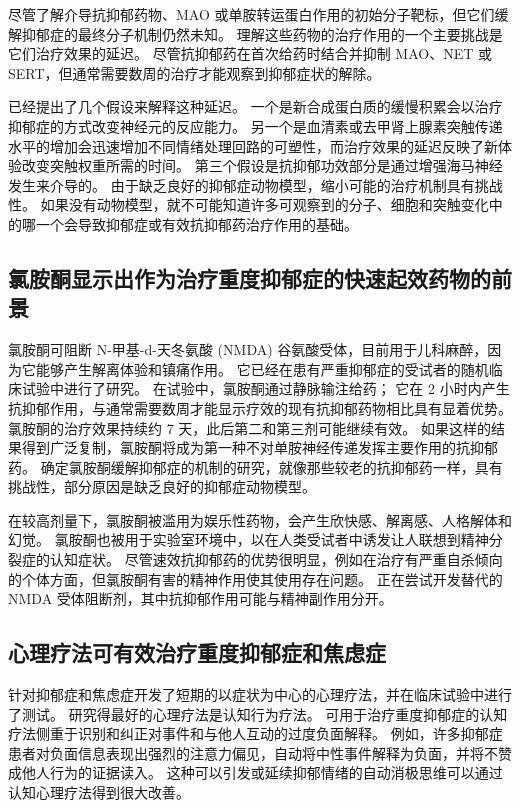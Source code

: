 尽管了解介导抗抑郁药物、MAO 或单胺转运蛋白作用的初始分子靶标，但它们缓解抑郁症的最终分子机制仍然未知。
理解这些药物的治疗作用的一个主要挑战是它们治疗效果的延迟。
尽管抗抑郁药在首次给药时结合并抑制 MAO、NET 或 SERT，但通常需要数周的治疗才能观察到抑郁症状的解除。


已经提出了几个假设来解释这种延迟。
一个是新合成蛋白质的缓慢积累会以治疗抑郁症的方式改变神经元的反应能力。
另一个是血清素或去甲肾上腺素突触传递水平的增加会迅速增加不同情绪处理回路的可塑性，而治疗效果的延迟反映了新体验改变突触权重所需的时间。
第三个假设是抗抑郁功效部分是通过增强海马神经发生来介导的。
由于缺乏良好的抑郁症动物模型，缩小可能的治疗机制具有挑战性。
如果没有动物模型，就不可能知道许多可观察到的分子、细胞和突触变化中的哪一个会导致抑郁症或有效抗抑郁药治疗作用的基础。



\subsection{氯胺酮显示出作为治疗重度抑郁症的快速起效药物的前景}

氯胺酮可阻断 N-甲基-d-天冬氨酸 (NMDA) 谷氨酸受体，目前用于儿科麻醉，因为它能够产生解离体验和镇痛作用。
它已经在患有严重抑郁症的受试者的随机临床试验中进行了研究。
在试验中，氯胺酮通过静脉输注给药；
它在 2 小时内产生抗抑郁作用，与通常需要数周才能显示疗效的现有抗抑郁药物相比具有显着优势。
氯胺酮的治疗效果持续约 7 天，此后第二和第三剂可能继续有效。
如果这样的结果得到广泛复制，氯胺酮将成为第一种不对单胺神经传递发挥主要作用的抗抑郁药。
确定氯胺酮缓解抑郁症的机制的研究，就像那些较老的抗抑郁药一样，具有挑战性，部分原因是缺乏良好的抑郁症动物模型。


在较高剂量下，氯胺酮被滥用为娱乐性药物，会产生欣快感、解离感、人格解体和幻觉。
氯胺酮也被用于实验室环境中，以在人类受试者中诱发让人联想到精神分裂症的认知症状。
尽管速效抗抑郁药的优势很明显，例如在治疗有严重自杀倾向的个体方面，但氯胺酮有害的精神作用使其使用存在问题。
正在尝试开发替代的 NMDA 受体阻断剂，其中抗抑郁作用可能与精神副作用分开。



\subsection{心理疗法可有效治疗重度抑郁症和焦虑症}

针对抑郁症和焦虑症开发了短期的以症状为中心的心理疗法，并在临床试验中进行了测试。
研究得最好的心理疗法是认知行为疗法。
可用于治疗重度抑郁症的认知疗法侧重于识别和纠正对事件和与他人互动的过度负面解释。
例如，许多抑郁症患者对负面信息表现出强烈的注意力偏见，自动将中性事件解释为负面，并将不赞成他人行为的证据读入。
这种可以引发或延续抑郁情绪的自动消极思维可以通过认知心理疗法得到很大改善。


